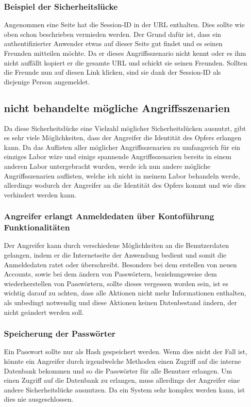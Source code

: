 \subsubsection{Beispiel der Sicherheitslücke}
Angenommen eine Seite hat die Session-ID in der URL enthalten. Dies sollte wie oben schon beschrieben vermieden werden. Der Grund dafür ist, dass ein authentifizierter Anwender etwas auf dieser Seite gut findet und es seinen Freunden mitteilen möchte. Da er dieses Angriffsszenario nicht kennt oder es ihm nicht auffällt kopiert er die gesamte URL und schickt sie seinen Freunden. Sollten die Freunde nun auf diesen Link klicken, sind sie dank der Session-ID als diejenige Person angemeldet.

\subsection{nicht behandelte mögliche Angriffsszenarien}
Da diese Sicherheitslücke eine Vielzahl möglicher Sicherheitslücken ausnutzt, gibt es sehr viele Möglichkeiten, dass der Angreifer die Identität des Opfers erlangen kann. Da das Auflisten aller möglicher Angriffsszenarien zu umfangreich für ein einziges Labor wäre und einige spannende Angriffsszenarien bereits in einem anderen Labor untergebracht wurden, werde ich nun andere mögliche Angriffsszenarien auflisten, welche ich nicht in meinem Labor behandeln werde, allerdings wodurch der Angreifer an die Identität des Opfers kommt und wie dies verhindert werden kann.
\subsubsection{Angreifer erlangt Anmeldedaten über Kontoführung Funktionalitäten}
Der Angreifer kann durch verschiedene Möglichkeiten an die Benutzerdaten gelangen, indem er die Internetseite der Anwendung bedient und somit die Anmeldedaten ratet oder überschreibt. Besonders bei dem erstellen von neuen Accounts, sowie bei dem ändern von Passwörtern, beziehungsweise dem wiederherstellen von Passwörtern, sollte dieses vergessen worden sein, ist es wichtig darauf zu achten, dass alle Aktionen nicht mehr Informationen enthalten, als unbedingt notwendig und diese Aktionen keinen Datenbestand ändern, der nicht geändert werden soll. 
\subsubsection{Speicherung der Passwörter}
Ein Passwort sollte nur als Hash gespeichert werden. Wenn dies nicht der Fall ist, könnte ein Angreifer durch irgendwelche Methoden einen Zugriff auf die interne Datenbank bekommen und so die Passwörter für alle Benutzer erlangen. Um einen Zugriff auf die Datenbank zu erlangen, muss allerdings der Angreifer eine andere Sicherheitslücke ausnutzen. Da ein System sehr komplex werden kann, ist dies nie ausgeschlossen.

